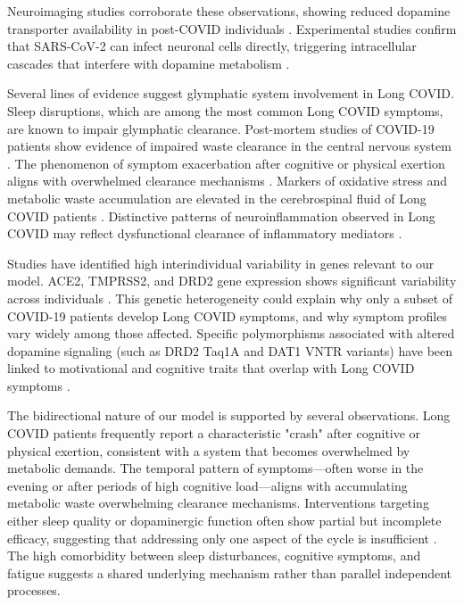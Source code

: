 \documentclass[12pt]{article}
\begin{document}
Neuroimaging studies corroborate these observations, showing reduced dopamine transporter availability in post-COVID individuals \citep{Lee2024}. Experimental studies confirm that SARS-CoV-2 can infect neuronal cells directly, triggering intracellular cascades that interfere with dopamine metabolism \citep{Cappelletti2023}.

Several lines of evidence suggest glymphatic system involvement in Long COVID. Sleep disruptions, which are among the most common Long COVID symptoms, are known to impair glymphatic clearance. Post-mortem studies of COVID-19 patients show evidence of impaired waste clearance in the central nervous system \citep{Thakur2021}. The phenomenon of symptom exacerbation after cognitive or physical exertion aligns with overwhelmed clearance mechanisms \citep{Pimentel2022}. Markers of oxidative stress and metabolic waste accumulation are elevated in the cerebrospinal fluid of Long COVID patients \citep{Frontera2022}. Distinctive patterns of neuroinflammation observed in Long COVID may reflect dysfunctional clearance of inflammatory mediators \citep{Fernandez-Castaneda2022}.

Studies have identified high interindividual variability in genes relevant to our model. ACE2, TMPRSS2, and DRD2 gene expression shows significant variability across individuals \citep{Cao2020, Hou2021, Eisenstein2016}. This genetic heterogeneity could explain why only a subset of COVID-19 patients develop Long COVID symptoms, and why symptom profiles vary widely among those affected. Specific polymorphisms associated with altered dopamine signaling (such as DRD2 Taq1A and DAT1 VNTR variants) have been linked to motivational and cognitive traits that overlap with Long COVID symptoms \citep{Gizer2009}.

The bidirectional nature of our model is supported by several observations. Long COVID patients frequently report a characteristic "crash" after cognitive or physical exertion, consistent with a system that becomes overwhelmed by metabolic demands. The temporal pattern of symptoms—often worse in the evening or after periods of high cognitive load—aligns with accumulating metabolic waste overwhelming clearance mechanisms. Interventions targeting either sleep quality or dopaminergic function often show partial but incomplete efficacy, suggesting that addressing only one aspect of the cycle is insufficient \citep{Beauchamp2022}. The high comorbidity between sleep disturbances, cognitive symptoms, and fatigue suggests a shared underlying mechanism rather than parallel independent processes.
\end{document}
